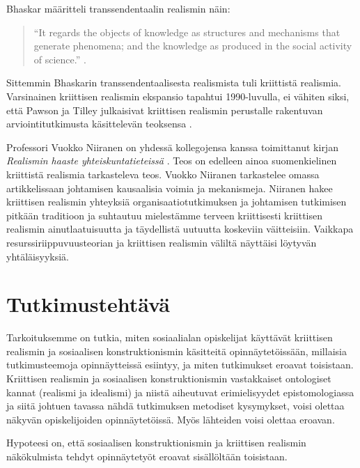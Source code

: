 \documentclass[a4paper,11pt,finnish]{article}
\begin{document}
Bhaskar määritteli transsendentaalin realismin näin:

\begin{quote}
``It regards the objects of knowledge as structures and mechanisms that
generate phenomena; and the knowledge as produced in the social activity
of science.'' \citep{Bhaskar_1975}.
\end{quote}

Sittemmin Bhaskarin transsendentaalisesta realismista tuli kriittistä
realismia. Varsinainen kriittisen realismin ekspansio tapahtui
1990-luvulla, ei vähiten siksi, että Pawson ja Tilley julkaisivat
kriittisen realismin perustalle rakentuvan arviointitutkimusta
käsittelevän teoksensa \citep{RefWorks:1045}.

Professori Vuokko Niiranen on yhdessä kollegojensa kanssa toimittanut
kirjan \emph{Realismin haaste yhteiskuntatieteissä} \citep{Solr-jykdok.1004015}.
Teos on edelleen ainoa suomenkielinen kriittistä realismia tarkasteleva
teos. Vuokko Niiranen tarkastelee omassa artikkelissaan johtamisen
kausaalisia voimia ja mekanismeja. \citep{niiranen2006} Niiranen hakee
kriittisen realismin yhteyksiä organisaatiotutkimuksen ja johtamisen
tutkimisen pitkään traditioon ja suhtautuu mielestämme terveen
kriittisesti kriittisen realismin ainutlaatuisuutta ja täydellistä
uutuutta koskeviin väitteisiin. Vaikkapa resurssiriippuvuusteorian ja
kriittisen realismin väliltä näyttäisi löytyvän yhtäläisyyksiä.

\par\null

\section*{Tutkimustehtävä}

{\label{934489}}

Tarkoituksemme on tutkia, miten sosiaalialan opiskelijat käyttävät
kriittisen realismin ja sosiaalisen konstruktionismin käsitteitä
opinnäytetöissään, millaisia tutkimusteemoja opinnäytteissä esiintyy, ja
miten tutkimukset eroavat toisistaan. Kriittisen realismin ja
sosiaalisen konstruktionismin vastakkaiset ontologiset kannat (realismi
ja idealismi) ja niistä aiheutuvat erimielisyydet epistomologiassa ja
siitä johtuen tavassa nähdä tutkimuksen metodiset kysymykset, voisi
olettaa näkyvän opiskelijoiden opinnäytetöissä. Myös lähteiden voisi
olettaa eroavan.

Hypoteesi on, että sosiaalisen konstruktionismin ja kriittisen realismin
näkökulmista tehdyt opinnäytetyöt eroavat sisällöltään toisistaan.
\end{document}
